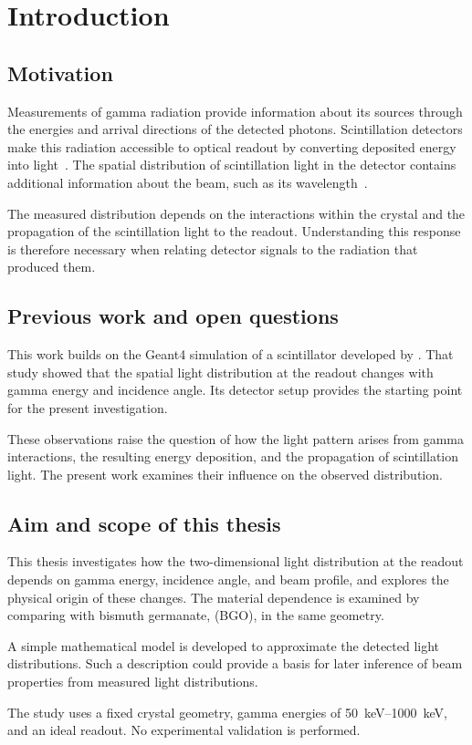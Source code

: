 \chapter{Introduction}

\section{Motivation}

Measurements of gamma radiation provide information about its sources through the energies and arrival directions of the detected photons. Scintillation detectors make this radiation accessible to optical readout by converting deposited energy into light~\parencite{pedrini2005scintillation}. The spatial distribution of scintillation light in the detector contains additional information about the beam, such as its wavelength~\parencite{ovsiannikova2020light}.

The measured distribution depends on the interactions within the crystal and the propagation of the scintillation light to the readout. Understanding this response is therefore necessary when relating detector signals to the radiation that produced them.

\section{Previous work and open questions}
This work builds on the Geant4 simulation of a  scintillator developed by \textcite{ovsiannikova2020light}. That study showed that the spatial light distribution at the readout changes with gamma energy and incidence angle. Its detector setup provides the starting point for the present investigation.

These observations raise the question of how the light pattern arises from gamma interactions, the resulting energy deposition, and the propagation of scintillation light. The present work examines their influence on the observed distribution.

\section{Aim and scope of this thesis}
This thesis investigates how the two-dimensional light distribution at the readout depends on gamma energy, incidence angle, and beam profile, and explores the physical origin of these changes. The material dependence is examined by comparing  with bismuth germanate,  (BGO), in the same geometry.

A simple mathematical model is developed to approximate the detected light distributions. Such a description could provide a basis for later inference of beam properties from measured light distributions.

The study uses a fixed crystal geometry, gamma energies of \qtyrange{50}{1000}{\kilo\electronvolt}, and an ideal readout. No experimental validation is performed.

